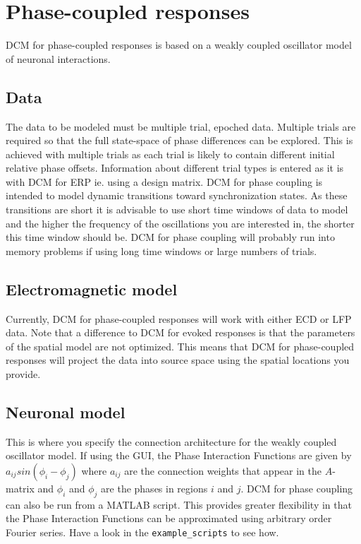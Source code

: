 \section{Phase-coupled responses}

DCM for phase-coupled responses is based on a weakly coupled oscillator model of neuronal interactions. 

\subsection{Data}
The data to be modeled must be multiple trial, epoched data. Multiple trials are required so that the full state-space of phase differences can be explored. This is achieved with multiple trials as each trial is likely to contain different initial relative phase offsets. Information about different trial types is entered as it is with DCM for ERP ie. using a design matrix. DCM for phase coupling is intended to model dynamic transitions toward synchronization states. As these transitions are short it is advisable to use short time windows of data to model and the higher the frequency of the oscillations you are interested in, the shorter this time window should be. DCM for phase coupling will probably run into memory problems if using long time windows or large numbers of trials.

\subsection{Electromagnetic model}
Currently, DCM for phase-coupled responses will work with either ECD or LFP data.  Note that a difference to DCM for evoked responses is that the parameters of the spatial model are not optimized. This means that DCM for phase-coupled responses will project the data into source space using the spatial locations you provide.

\subsection{Neuronal model}
This is where you specify the connection architecture for the weakly coupled oscillator model. If using the GUI, the Phase Interaction Functions are given by $a_{ij} sin (\phi_i-\phi_j)$ where $a_{ij}$ are the connection weights that appear in the $A$-matrix and $\phi_i$ and $\phi_j$ are the phases in regions $i$ and $j$. DCM for phase coupling can also be run from a MATLAB script. This provides greater flexibility in that the Phase Interaction Functions can be approximated using arbitrary order Fourier series. Have a look in the \texttt{example\_scripts} to see how.

